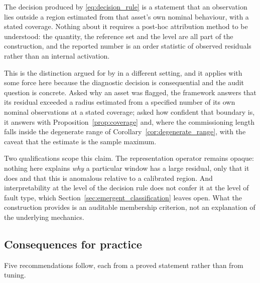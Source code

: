 \documentclass[a4paper]{cas-sc}
\begin{document}
The decision produced by \eqref{eq:decision_rule} is a statement that an
observation lies outside a region estimated from that asset's own nominal
behaviour, with a stated coverage. Nothing about it requires a post-hoc
attribution method to be understood: the quantity, the reference set and the
level are all part of the construction, and the reported number is an order
statistic of observed residuals rather than an internal activation.

This is the distinction argued for by \citet{rudin2019} in a different
setting, and it applies with some force here because the diagnostic decision
is consequential and the audit question is concrete. Asked why an asset was
flagged, the framework answers that its residual exceeded a radius estimated
from a specified number of its own nominal observations at a stated coverage;
asked how confident that boundary is, it answers with
Proposition~\ref{prop:coverage} and, where the commissioning length falls
inside the degenerate range of
Corollary~\ref{cor:degenerate_range}, with the caveat that the estimate is the
sample maximum.

Two qualifications scope this claim. The representation operator remains
opaque: nothing here explains \emph{why} a particular window has a large
residual, only that it does and that this is anomalous relative to a
calibrated region. And interpretability at the level of the decision rule does
not confer it at the level of fault type, which
Section~\ref{sec:emergent_classification} leaves open. What the construction
provides is an auditable membership criterion, not an explanation of the
underlying mechanics.

\subsection{Consequences for practice}
\label{subsec:disc_practice}

Five recommendations follow, each from a proved statement rather than from
tuning.
\end{document}
